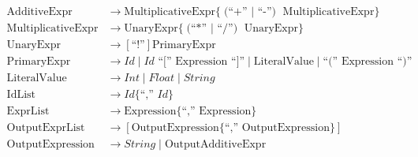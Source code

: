 \documentclass[12pt,a4paper]{article}
\begin{document}
\[\begin{array}{rl}
		\text{AdditiveExpr}             & \rightarrow \text{MultiplicativeExpr} \{ \text{(``+'' $\mid$ ``-'') } \text{MultiplicativeExpr} \}                                                                          \\

		\text{MultiplicativeExpr}       & \rightarrow \text{UnaryExpr} \{ \text{(``*'' $\mid$ ``/'') } \text{UnaryExpr} \}                                                                                            \\

		\text{UnaryExpr}                & \rightarrow [\text{``!''}] \text{PrimaryExpr}                                                                                                                               \\

		\text{PrimaryExpr}              & \rightarrow \mathit{Id} \mid \mathit{Id} \text{ ``['' } \text{Expression} \text{ ``]''} \mid \text{LiteralValue} \mid \text{``('' } \text{Expression} \text{ ``)''}         \\

		\text{LiteralValue}             & \rightarrow \mathit{Int} \mid \mathit{Float} \mid \mathit{String}                                                                                                           \\

		\text{IdList}                   & \rightarrow \mathit{Id} \{ \text{``,'' } \mathit{Id} \}                                                                                                                     \\

		\text{ExprList}                 & \rightarrow \text{Expression} \{ \text{``,'' } \text{Expression} \}                                                                                                         \\

		\text{OutputExprList}           & \rightarrow [ \text{OutputExpression} \{ \text{``,'' } \text{OutputExpression} \} ]                                                                                         \\

		\text{OutputExpression}         & \rightarrow \mathit{String} \mid \text{OutputAdditiveExpr}                                                                                                                  \\


\end{array}\]
\end{document}
